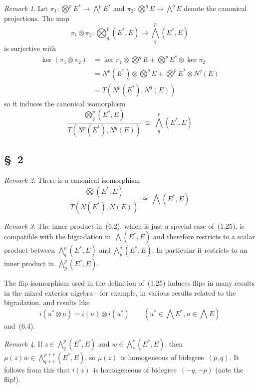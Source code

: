 \documentclass[letterpaper,12pt]{article}
\newcommand{\iso}{\cong}
\newcommand{\tprod}{\otimes}
\newcommand{\bigtprod}{\bigotimes}
\newcommand{\medtprod}{{\textstyle\bigtprod}}
\newcommand{\bigeprod}{\bigwedge}
\newcommand{\medeprod}{{\textstyle\bigeprod}}
\theoremstyle{definition}
\theoremstyle{remark}
\newtheorem*{rmk}{Remark}
\begin{document}
\begin{rmk}
Let \(\pi_1:\medtprod^p E^*\to\medeprod^p E^*\) and \(\pi_2:\medtprod^q E\to\medeprod^q E\) denote the canonical projections. The map
\[\pi_1\tprod\pi_2:\medtprod^p_q(E^*,E)\to\medeprod^p_q(E^*,E)\]
is surjective with
\begin{align*}
\ker(\pi_1\tprod\pi_2)&=\ker\pi_1\tprod\medtprod^q E+\medtprod^p E^*\tprod\ker\pi_2\\
	&=N^p(E^*)\tprod\medtprod^q E+\medtprod^p E^*\tprod N^q(E)\\
	&=T(N^p(E^*),N^q(E))
\end{align*}
so it induces the canonical isomorphism
\[\frac{\medtprod^p_q(E^*,E)}{T(N^p(E^*),N^q(E))}\ \iso\ \medeprod^p_q(E^*,E)\]
\end{rmk}

\subsection*{\S~2}
\begin{rmk}
There is a canonical isomorphism
\[\frac{\medtprod(E^*,E)}{T(N(E^*),N(E))}\ \iso\ \medeprod(E^*,E)\]
\end{rmk}

\begin{rmk}
The inner product in~(6.2), which is just a special case of~(1.25), is compatible with the bigradation in~\(\medeprod(E^*,E)\) and therefore restricts to a scalar product between \(\medeprod^p_q(E^*,E)\) and \(\medeprod^q_p(E^*,E)\). In particular it restricts to an inner product in~\(\medeprod^p_p(E^*,E)\).

The flip isomorphism used in the definition of~(1.25) induces flips in many results in the mixed exterior algebra---for example, in various results related to the bigradation, and results like
\[i(u^*\tprod u)=i(u)\tprod i(u^*)\qquad(u^*\in\medeprod E^*,u\in\medeprod E)\]
and~(6.4).
\end{rmk}

\begin{rmk}
If \(z\in\medeprod^p_q(E^*,E)\) and \(w\in\medeprod^r_s(E^*,E)\), then \(\mu(z)w\in\medeprod^{p+r}_{q+s}(E^*,E)\), so \(\mu(z)\)~is homogeneous of bidegree~\((p,q)\). It follows from this that \(i(z)\)~is homogeneous of bidegree~\((-q,-p)\) (note the flip!).
\end{rmk}
\end{document}
